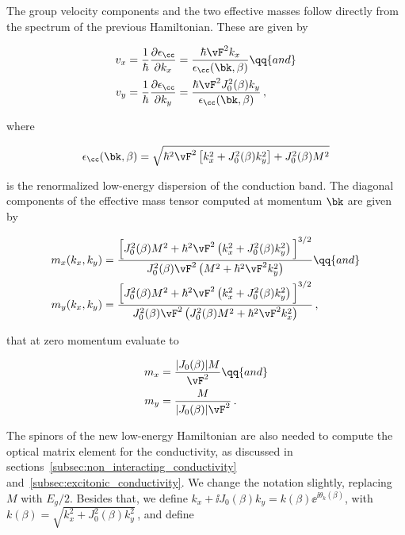 The group velocity components and the two effective masses follow directly from the spectrum of the previous Hamiltonian.
These are given by

\begin{equation}
\begin{aligned}
    v_{x} & =\frac{1}{\hbar}\frac{\partial \epsilon_{\cc}}{\partial k_{x}}=\frac{\hbar \vF^{2}k_{x}}{\epsilon_{\cc}(\bk,\beta)} \qq{and}\\
    v_{y} & =\frac{1}{\hbar}\frac{\partial \epsilon_{\cc}}{\partial k_{y}}=\frac{\hbar \vF^{2}J_{0}^{2}(\beta)k_{y}}{\epsilon_{\cc}(\bk,\beta)} \,,
\end{aligned}
\end{equation}

\noindent where

\begin{equation}
\epsilon_{\cc}(\bk,\beta)=\sqrt{\hbar^{2}\vF^{2}\left[k_{x}^{2}+J_{0}^{2}(\beta)k_{y}^{2}\right] + J_{0}^{2}(\beta)M^{2}}
\end{equation}

\noindent is the renormalized low-energy dispersion of the conduction band.
The diagonal components of the effective mass tensor computed at momentum $\bk$ are given by

\begin{subequations}
    \begin{align}
        m_{x}(k_{x},k_{y}) &= \frac{\Big[J_{0}^{2}(\beta)M^{2}+\hbar^{2}\vF^{2}\left(k_{x}^{2}+J_{0}^{2}(\beta)k_{y}^{2}\right)\Big]^{3/2}}{J_{0}^{2}(\beta) \vF^{2} \left(M^{2}+\hbar^{2}\vF^{2}k_{y}^{2}\right)} \qq{and} \\
        m_{y}(k_{x},k_{y}) &= \frac{\Big[J_{0}^{2}(\beta)M^{2}+\hbar^{2}\vF^{2}\left(k_{x}^{2}+J_{0}^{2}(\beta)k_{y}^{2}\right)\Big]^{3/2}}{J_{0}^{2}(\beta) \vF^{2} \left(J_{0}^{2}(\beta) M^{2}+\hbar^{2}\vF^{2}k_{x}^{2}\right)}\,,
    \end{align}
\end{subequations}

\noindent that at zero momentum evaluate to

\begin{subequations}
    \begin{align}
        m_{x}&=\frac{|J_{0}(\beta)|M}{\vF^{2}} \qq{and} \\
        m_{y}&=\frac{M}{|J_{0}(\beta)|\vF^{2}}\,.
    \end{align}
\end{subequations}

The spinors of the new low-energy Hamiltonian are also needed to compute the optical matrix element for the conductivity, as discussed in sections~\ref{subsec:non_interacting_conductivity} and~\ref{subsec:excitonic_conductivity}.
We change the notation slightly, replacing $M$ with $E_{g}/2$.
Besides that, we define $k_{x} + \ii J_{0}(\beta) k_{y} = k(\beta)\ee^{\ii\theta_{k}(\beta)}$, with $k(\beta)=\sqrt{k_{x}^{2}+J_{0}^{2}(\beta)k_{y}^{2}}$\,, and define

